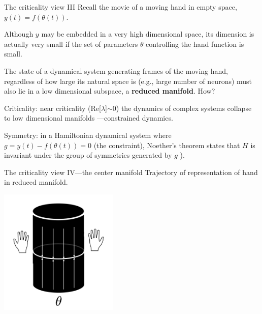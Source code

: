   \begin{frame}[label=ladila]{The criticality view III}
  Recall the movie of a moving hand in empty space, $y(t) = f(\theta(t))$. %
  \vfill
  
  Although $y$ may be embedded in a very high dimensional space, its dimension is actually very small if the set of parameters $\theta$ controlling the hand function is small.\vfill
  
The state of a dynamical system generating frames of the moving hand, regardless of how large its natural space is  (e.g.,   large number of neurons) must also lie in a low dimensional subspace, a {\bf reduced manifold}. How?  \vfill
  
   Criticality: near criticality (Re[$\lambda$]$\sim0$) the dynamics of complex systems collapse to low dimensional manifolds   \citep{Jirsa2020,Jirsa2022}---constrained dynamics. \vfill
   
   Symmetry: in a Hamiltonian dynamical system where $g = y(t)-f(\theta(t)) = 0$  (the constraint),  Noether's theorem states that  $H$ is invariant under the group of symmetries generated by $g$  \citep{Dirac2001-gi,Jose1998-qy}). 

\end{frame}

\begin{frame}[label=ladila]{The criticality view IV---the center manifold}
Trajectory of representation of hand in reduced manifold. 
 \begin{center}
  \includegraphics[height=6cm]{img/cylinder.png}
  \end{center}


\end{frame}


